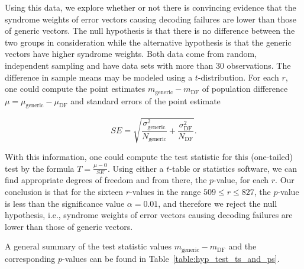Using this data, we explore whether or not there is convincing evidence that the syndrome weights of error vectors causing decoding failures are lower than those of generic vectors. The null hypothesis is that there is no difference between the two groups in consideration while the alternative hypothesis is that the generic vectors have higher syndrome weights. Both data come from random, independent sampling and have data sets with more than 30 observations. The difference in sample means may be modeled using a $t$-distribution. For each $r$, one could compute the point estimates $m_{\text{generic}} - m_{\text{DF}}$ of population difference $\mu = \mu_{\text{generic}} - \mu_{\text{DF}}$ and standard errors of the point estimate 

$$SE = \sqrt{\frac{\sigma_{\text{generic}}^2}{N_{\text{generic}} } +\frac{\sigma_{\text{DF}}^2}{N_{\text{DF}} } }.$$

With this information, one could compute the test statistic for this (one-tailed) test by the formula $T = \frac{\mu - 0}{SE}$. Using either a $t$-table or statistics software, we can find appropriate degrees of freedom and from there, the $p$-value, for each $r$. Our conclusion is that for the sixteen $r$-values in the range $509 \leq r \leq 827$, the $p$-value is less than the significance value $\alpha = 0.01$, and therefore we reject the null hypothesis, i.e., syndrome weights of error vectors causing decoding failures are lower than those of generic vectors.

A general summary of the test statistic values $m_{\text{generic}} - m_{\text{DF}}$ and the corresponding $p$-values can be found in Table~\ref{table:hyp_test_ts_and_ps}.


